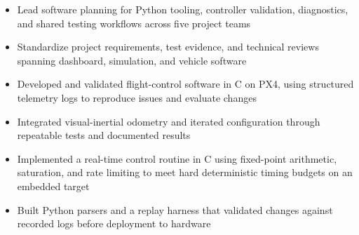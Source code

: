 \documentclass[10pt,letterpaper]{article}
\begin{document}
\bodyfont

\resumeheader
\educationsection




\orgline{\spartanracing}
\begin{itemize}
  \item Lead software planning for Python tooling, controller validation, diagnostics, and shared testing workflows across five project teams
  \item Standardize project requirements, test evidence, and technical reviews spanning dashboard, simulation, and vehicle software
\end{itemize}

\entryspace

\begin{itemize}
  \item Developed and validated flight-control software in C on PX4, using structured telemetry logs to reproduce issues and evaluate changes
  \item Integrated visual-inertial odometry and iterated configuration through repeatable tests and documented results
\end{itemize}

\entryspace

\orgline{\spartanracing}
\begin{itemize}
  \item Implemented a real-time control routine in C using fixed-point arithmetic, saturation, and rate limiting to meet hard deterministic timing budgets on an embedded target
  \item Built Python parsers and a replay harness that validated changes against recorded logs before deployment to hardware
\end{itemize}
\end{document}

